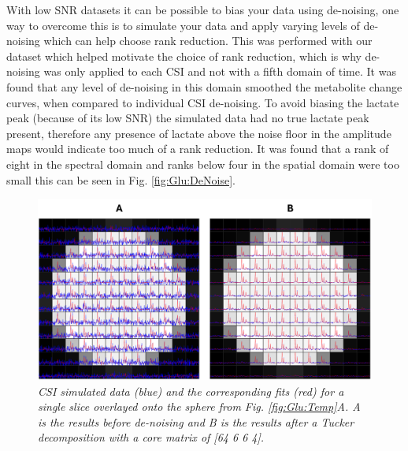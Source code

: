 With low \ac{SNR} datasets it can be possible to bias your data using de-noising, one way to overcome this is to simulate your data and apply varying levels of de-noising which can help choose rank reduction. This was performed with our dataset which helped motivate the choice of rank reduction, which is why de-noising was only applied to each \ac{CSI} and not with a fifth domain of time. It was found that any level of de-noising in this domain smoothed the metabolite change curves, when compared to individual \ac{CSI} de-noising. To avoid biasing the lactate peak (because of its low \ac{SNR}) the simulated data had no true lactate peak present, therefore any presence of lactate above the noise floor in the amplitude maps would indicate too much of a rank reduction. It was found that a rank of eight in the spectral domain and ranks below four in the spatial domain were too small this can be seen in Fig. \ref{fig:Glu:DeNoise}.

\begin{figure}
   \centering
   \includegraphics[width = 1\textwidth]{Figures/Glucose/DeNoise_Spectra.png}
   \caption{\textit{\ac{CSI} simulated data (blue) and the corresponding fits (red) for a single slice overlayed onto the sphere from Fig. \ref{fig:Glu:Temp}A. A is the results before de-noising and B is the results after a Tucker decomposition with a core matrix of [64 6 6 4].}}
   \label{fig:Glu:DeNoise_spectra}
\end{figure}

